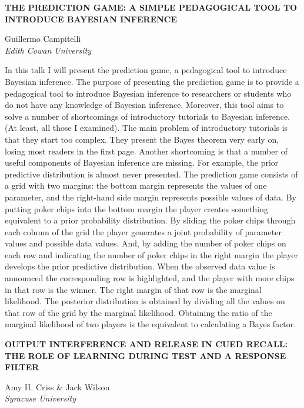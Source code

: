 \documentclass[]{article}
\begin{document}
\textbf{THE PREDICTION GAME: A SIMPLE PEDAGOGICAL TOOL TO INTRODUCE
BAYESIAN INFERENCE}

Guillermo Campitelli\\
\emph{Edith Cowan University }

In this talk I will present the prediction game, a pedagogical tool to
introduce Bayesian inference. The purpose of presenting the prediction
game is to provide a pedagogical tool to introduce Bayesian inference to
researchers or students who do not have any knowledge of Bayesian
inference. Moreover, this tool aims to solve a number of shortcomings of
introductory tutorials to Bayesian inference. (At least, all those I
examined). The main problem of introductory tutorials is that they start
too complex. They present the Bayes theorem very early on, losing most
readers in the first page. Another shortcoming is that a number of
useful components of Bayesian inference are missing. For example, the
prior predictive distribution is almost never presented. The prediction
game consists of a grid with two margins: the bottom margin represents
the values of one parameter, and the right-hand side margin represents
possible values of data. By putting poker chips into the bottom margin
the player creates something equivalent to a prior probability
distribution. By sliding the poker chips through each column of the grid
the player generates a joint probability of parameter values and
possible data values. And, by adding the number of poker chips on each
row and indicating the number of poker chips in the right margin the
player develops the prior predictive distribution. When the observed
data value is announced the corresponding row is highlighted, and the
player with more chips in that row is the winner. The right margin of
that row is the marginal likelihood. The posterior distribution is
obtained by dividing all the values on that row of the grid by the
marginal likelihood. Obtaining the ratio of the marginal likelihood of
two players is the equivalent to calculating a Bayes factor.\\
\pagebreak  

\textbf{OUTPUT INTERFERENCE AND RELEASE IN CUED RECALL: THE ROLE OF
LEARNING DURING TEST AND A RESPONSE FILTER}

Amy H. Criss \& Jack Wilson\\
\emph{Syracuse University}
\end{document}
